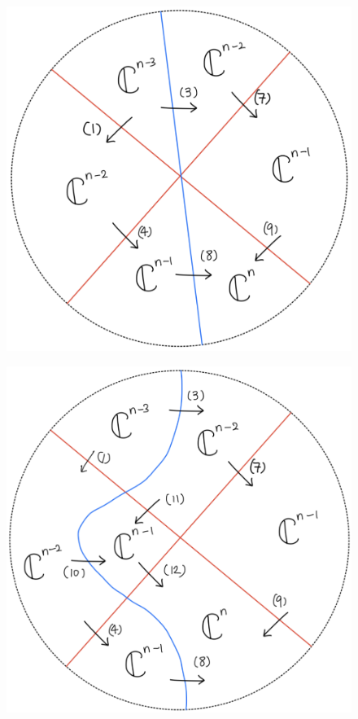 \begin{figure}[H]
    \centering
    \includegraphics[scale = 0.95]{diagrams/cobord'4/29.png}
    \caption{}
    \label{fig:your-label}
\end{figure}
\begin{figure}[H]
    \centering
    \includegraphics[scale = 0.95]{diagrams/cobord'4/30.png}
    \caption{}
    \label{fig:your-label}
\end{figure}
